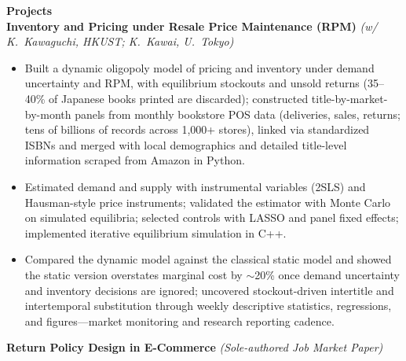 \documentclass[11pt,letterpaper]{article}
\begin{document}
{\large \textbf{Projects}}\\[-0.5pt]
\textbf{Inventory and Pricing under Resale Price Maintenance (RPM)} \textit{(w/ K.\ Kawaguchi, HKUST; K.\ Kawai, U.\ Tokyo)}\\
\vspace{-6pt}
\begin{itemize}
  \item Built a dynamic oligopoly model of pricing and inventory under demand uncertainty and RPM, with equilibrium stockouts and unsold returns (35--40\% of Japanese books printed are discarded); constructed title-by-market-by-month panels from monthly bookstore POS data (deliveries, sales, returns; tens of billions of records across 1{,}000+ stores), linked via standardized ISBNs and merged with local demographics and detailed title-level information scraped from Amazon in Python.
  \item Estimated demand and supply with instrumental variables (2SLS) and Hausman-style price instruments; validated the estimator with Monte Carlo on simulated equilibria; selected controls with LASSO and panel fixed effects; implemented iterative equilibrium simulation in C++.
  \item Compared the dynamic model against the classical static model and showed the static version overstates marginal cost by \(\sim\)20\% once demand uncertainty and inventory decisions are ignored; uncovered stockout-driven intertitle and intertemporal substitution through weekly descriptive statistics, regressions, and figures---market monitoring and research reporting cadence.
\end{itemize}
\vspace{-3pt}
\textbf{Return Policy Design in E-Commerce} \textit{(Sole-authored Job Market Paper)}\\
\vspace{-6pt}
\end{document}
